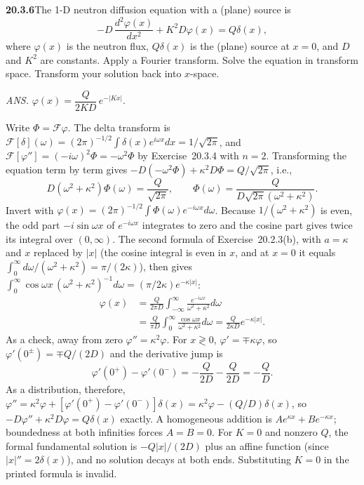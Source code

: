 \par\bigskip
\noindent\textbf{20.3.6}\quad The 1-D neutron diffusion equation
with a (plane) source is
\[
-D\,\frac{d^{2}\varphi(x)}{dx^{2}}+K^{2}D\varphi(x)=Q\delta(x),
\]
where $\varphi(x)$ is the neutron flux, $Q\delta(x)$ is the
(plane) source at $x=0$, and $D$ and $K^{2}$ are constants. Apply
a Fourier transform. Solve the equation in transform space.
Transform your solution back into $x$-space.
\par\nobreak\hfill\emph{ANS.}\enspace
$\varphi(x)=\dfrac{Q}{2KD}\,e^{-|Kx|}$.
\par{}
\solution
{}
Write $\Phi=\mathcal F\varphi$. The delta transform is
$\mathcal F[\delta](\omega)=(2\pi)^{-1/2}\int\delta(x)e^{i\omega x}dx
=1/\sqrt{2\pi}$, and
$\mathcal F[\varphi'']=(-i\omega)^2\Phi=-\omega^2\Phi$ by
Exercise~20.3.4 with $n=2$. Transforming the equation term by
term gives $-D(-\omega^2\Phi)+\kappa^2D\Phi=Q/\sqrt{2\pi}$, i.e.,
\[
D(\omega^2+\kappa^2)\Phi(\omega)=\frac Q{\sqrt{2\pi}},
\qquad \Phi(\omega)=\frac{Q}{D\sqrt{2\pi}(\omega^2+\kappa^2)}.
\]
Invert with $\varphi(x)=(2\pi)^{-1/2}\int\Phi(\omega)e^{-i\omega x}d\omega$.
Because $1/(\omega^2+\kappa^2)$ is even, the odd part
$-i\sin\omega x$ of $e^{-i\omega x}$ integrates to zero and the
cosine part gives twice its integral over $(0,\infty)$. The second
formula of Exercise~20.2.3(b), with $a=\kappa$ and $x$ replaced by
$|x|$ (the cosine integral is even in $x$, and at $x=0$ it equals
$\int_0^\infty d\omega/(\omega^2+\kappa^2)=\pi/(2\kappa)$), then gives
$\int_0^\infty\cos\omega x\,(\omega^2+\kappa^2)^{-1}d\omega
=(\pi/2\kappa)e^{-\kappa|x|}$:
\begin{align*}
\varphi(x)&=\frac{Q}{2\pi D}\int_{-\infty}^{\infty}
\frac{e^{-i\omega x}}{\omega^2+\kappa^2}d\omega\\
&=\frac{Q}{\pi D}\int_0^\infty
\frac{\cos\omega x}{\omega^2+\kappa^2}d\omega
=\boxed{\frac{Q}{2\kappa D}e^{-\kappa|x|}}.
\end{align*}
As a check, away from zero $\varphi''=\kappa^2\varphi$. For
$x\gtrless0$, $\varphi'=\mp\kappa\varphi$, so
$\varphi'(0^\pm)=\mp Q/(2D)$ and the derivative jump is
\[
\varphi'(0^+)-\varphi'(0^-)
=-\frac{Q}{2D}-\frac{Q}{2D}=-\frac QD.
\]
As a distribution, therefore,
$\varphi''=\kappa^2\varphi+[\varphi'(0^+)-\varphi'(0^-)]\delta(x)
=\kappa^2\varphi-(Q/D)\delta(x)$, so
$-D\varphi''+\kappa^2D\varphi=Q\delta(x)$ exactly.
A homogeneous addition is $A e^{\kappa x}+B e^{-\kappa x}$;
boundedness at both infinities forces $A=B=0$.
For $K=0$ and nonzero $Q$, the formal fundamental solution is
$-Q|x|/(2D)$ plus an affine function (since $|x|''=2\delta(x)$),
and no solution decays at
both ends. Substituting $K=0$ in the printed formula is invalid.

